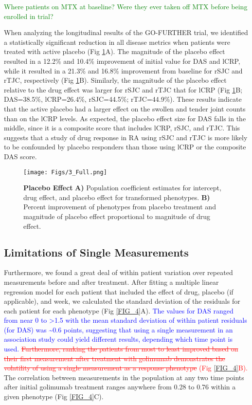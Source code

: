 \textcolor{green}{Where patients on MTX at baseline? Were they ever taken off MTX before being enrolled in trial?}

When analyzing the longitudinal results of the GO-FURTHER trial, we identified a statistically significant reduction in all disease metrics when patients were treated with active placebo (Fig \ref{FIG_3}A). The magnitude of the placebo effect resulted in a 12.2\% and 10.4\% improvement of initial value for DAS and lCRP, while it resulted in a 21.3\% and 16.8\% improvement from baseline for rSJC and rTJC, respectively (Fig \ref{FIG_3}B). Similarly, the magnitude of the placebo effect relative to the drug effect was larger for rSJC and rTJC that for lCRP (Fig \ref{FIG_3}B; DAS=38.5\%, lCRP=26.4\%, rSJC=44.5\%; rTJC=44.9\%). These results indicate that the active placebo had a larger effect on the swollen and tender joint counts than on the lCRP levels. As expected, the placebo effect size for DAS falls in the middle, since it is a composite score that includes lCRP, rSJC, and rTJC. This suggests that a study of drug response in RA using rSJC and rTJC is more likely to be confounded by placebo responders than those using lCRP or the composite DAS score.

\begin{figure}[h!]
  \centering
  \texttt{[image: Figs/3\_Full.png]}
  \caption{ {\bf Placebo Effect} {\bf A)} Population coefficient estimates for intercept, drug effect, and placebo effect for transformed phenotypes. {\bf B)} Percent improvement of phenotypes from placebo treatment and magnitude of placebo effect proportional to magnitude of drug effect. }
  \label{FIG_3}
\end{figure}


\subsection{Limitations of Single Measurements}

Furthermore, we found a great deal of within patient variation over repeated measurements before and after treatment. After fitting a multiple linear regression model for each patient that included the effect of drug, placebo (if applicable), and week, we calculated the standard deviation of the residuals for each patient for each phenotype (Fig \ref{FIG_4}A). \textcolor{blue}{The values for DAS ranged from near 0 to \textgreater1.5 with the mean standard deviation of within patient residuals (for DAS) was \textasciitilde0.6 points, suggesting that using a single measurement in an association study could yield different results, depending which time point is used.} \textcolor{red}{\st{ Furthermore, ranking the patients from most to least improved based on their first measurement after treatment with golimumab demonstrates the volatility of using a single measurement as a response phenotype} (Fig \ref{FIG_4}B).} The correlation between measurements in the population at any two time points after initial golimumab treatment ranges anywhere from 0.28 to 0.76 within a given phenotype (Fig \ref{FIG_4}C).

